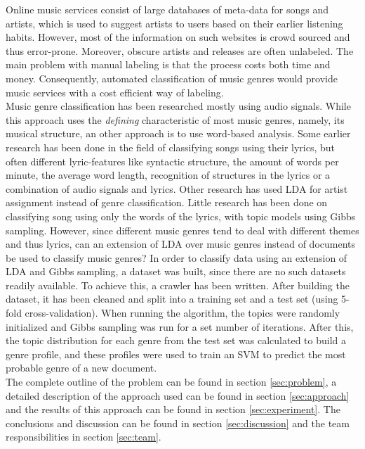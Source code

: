 
Online music services consist of large databases of meta-data for songs and artists, which is used to suggest artists to users based on their earlier listening habits. However, most of the information on such websites is crowd sourced and thus error-prone. Moreover, obscure artists and releases are often unlabeled. The main problem with manual labeling is that the process costs both time and money.  Consequently, automated classification of music genres would provide music services with a cost efficient way of labeling.\\
Music genre classification has been researched mostly using audio signals\cite{audio_classification}. While this approach uses the \textit{defining} characteristic of most music genres, namely, its musical structure, an other approach is to use word-based analysis. Some earlier research has been done in the field of classifying songs using their lyrics, but often different lyric-features like syntactic structure\cite{felllyrics}, the amount of words per minute, the average word length\cite{mayeraudiolyrics}, recognition of structures in the lyrics\cite{maxwellgenome} or a combination of audio signals and lyrics\cite{mayeraudiolyrics}. Other research has used LDA for artist assignment instead of genre classification\cite{liartists}. Little research has been done on classifying song using only the words of the lyrics\cite{stateoftheart}, with topic models using Gibbs sampling. However, since different music genres tend to deal with different themes and thus lyrics, can an extension of LDA over music genres instead of documents be used to classify music genres?
In order to classify data using an extension of LDA and Gibbs sampling, a dataset was built, since there are no such datasets readily available. To achieve this, a crawler has been written. After building the dataset, it has been cleaned and split into a training set and a test set (using 5-fold cross-validation). When running the algorithm, the topics were randomly initialized and Gibbs sampling was run for a set number of iterations. After this, the topic distribution for each genre from the test set was calculated to build a genre profile, and these profiles were used to train an SVM to predict the most probable genre of a new document.\\
The complete outline of the problem can be found in section \ref{sec:problem}, a detailed description of the approach used can be found in section \ref{sec:approach} and the results of this approach can be found in section \ref{sec:experiment}. The conclusions and discussion can be found in section \ref{sec:discussion} and the team responsibilities in section \ref{sec:team}.
